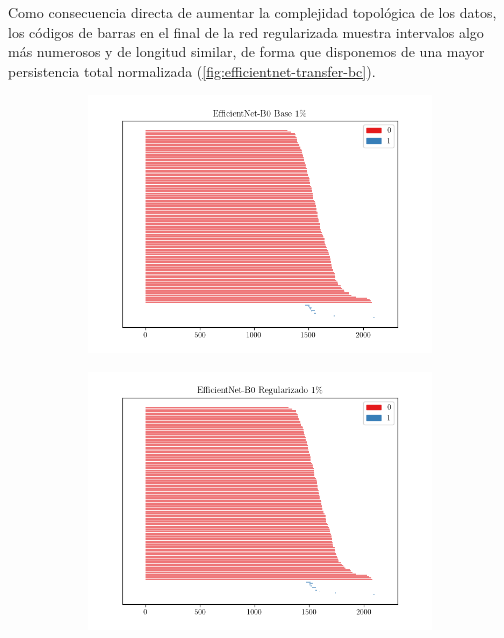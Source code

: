 Como consecuencia directa de aumentar la complejidad topológica de los datos, los
códigos de barras en el final de la red regularizada muestra intervalos algo más
numerosos y de longitud similar, de forma que disponemos de una mayor
persistencia total normalizada (\autoref{fig:efficientnet-transfer-bc}).

\begin{figure}[H]
	\centering
	\begin{subfigure}
		{.5\textwidth}
		\centering
		\includegraphics[width=\linewidth]{img/bar_efficientnet_trans_base_0.01.png}
	\end{subfigure}%
	\begin{subfigure}
		{.5\textwidth}
		\centering
		\includegraphics[width=\linewidth]{img/bar_efficientnet_trans_reg_0.01.png}

\end{subfigure}
\end{figure}
